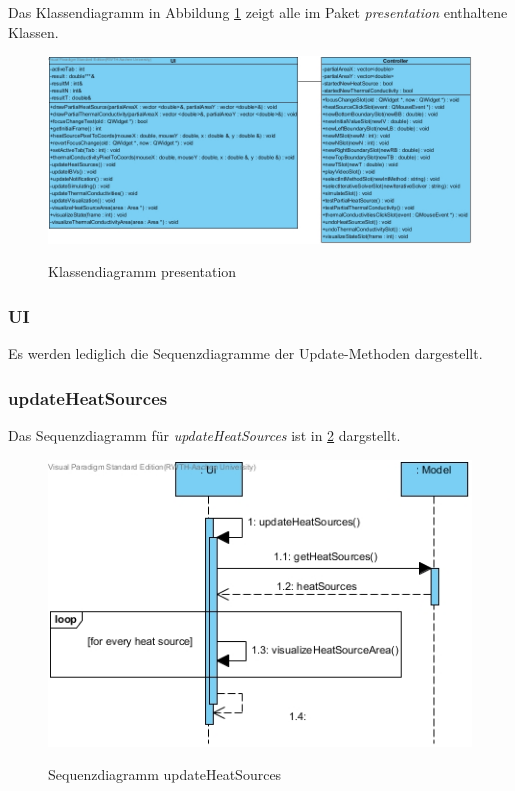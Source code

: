 Das Klassendiagramm in Abbildung \ref{Klassendiagramm presentation} zeigt alle im Paket \emph{presentation} enthaltene Klassen.

\begin{figure}[H]
	\centering
	\includegraphics[scale=.9]{Bilder/presentation.jpg}\\
	\caption{Klassendiagramm presentation}
	\label{Klassendiagramm presentation}
\end{figure}

\subsubsection{UI}

Es werden lediglich die Sequenzdiagramme der Update-Methoden dargestellt.

\subsubsection*{updateHeatSources}

Das Sequenzdiagramm für \emph{updateHeatSources} ist in \ref{Sequenzdiagramm updateHeatSources} dargstellt.

\begin{figure}[H]
	\centering
	\includegraphics[scale=.6]{Bilder/Ui__updateHeatSources().jpg}\\
	\caption{Sequenzdiagramm updateHeatSources}
	\label{Sequenzdiagramm updateHeatSources}
\end{figure}

